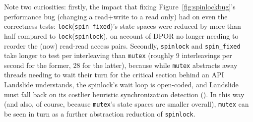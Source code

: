 Note two curiosities:
firstly,
the impact that fixing Figure~\ref{fig:spinlockbug}'s performance bug
(changing a read+write to a read only)
had on even the correctness tests:
{\tt lock}({\tt spin\_fixed})'s state spaces were reduced by more than half compared to {\tt lock}({\tt spinlock}),
on account of DPOR no longer needing to reorder the (now) read-read access pairs.
Secondly, {\tt spinlock} and {\tt spin\_fixed} take longer to test per interleaving
than {\tt mutex}
(roughly 9 interleavings per second for the former, 28 for the latter),
because while {\tt mutex} abstracts away threads needing to wait their turn for the critical section
behind an API Landslide understands,
the spinlock's wait loop is open-coded, and Landslide must fall back on its costlier heuristic synchronization detection
(\sect{\ref{sec:landslide-blocking}}).
In this way (and also, of course, because {\tt mutex}'s state spaces are smaller overall),
{\tt mutex} can be seen in turn as a further abstraction reduction of {\tt spinlock}.

